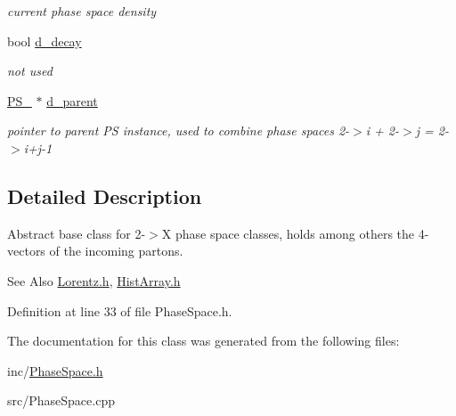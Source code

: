 \begin{DoxyCompactItemize}
\begin{DoxyCompactList}\small\item\em current phase space density \end{DoxyCompactList}\item 
\hypertarget{classPS__2_a973be656af67bb3516424e664a49ae55}{bool \hyperlink{classPS__2_a973be656af67bb3516424e664a49ae55}{d\-\_\-decay}}\label{classPS__2_a973be656af67bb3516424e664a49ae55}

\begin{DoxyCompactList}\small\item\em not used \end{DoxyCompactList}\item 
\hypertarget{classPS__2_abebb860c3c4a1c5054bc223d3aac4f45}{\hyperlink{classPS__2}{P\-S\-\_} $\ast$ \hyperlink{classPS__2_abebb860c3c4a1c5054bc223d3aac4f45}{d\-\_\-parent}}\label{classPS__2_abebb860c3c4a1c5054bc223d3aac4f45}

\begin{DoxyCompactList}\small\item\em pointer to parent P\-S instance, used to combine phase spaces 2-\/$>$i + 2-\/$>$j = 2-\/$>$i+j-\/1 \end{DoxyCompactList}\end{DoxyCompactItemize}


\subsection{Detailed Description}
Abstract base class for 2-\/$>$X phase space classes, holds among others the 4-\/vectors of the incoming partons. \begin{DoxySeeAlso}{See Also}
\hyperlink{Lorentz_8h}{Lorentz.\-h}, \hyperlink{HistArray_8h}{Hist\-Array.\-h} 
\end{DoxySeeAlso}


Definition at line 33 of file Phase\-Space.\-h.



The documentation for this class was generated from the following files\-:\begin{DoxyCompactItemize}
\item 
inc/\hyperlink{PhaseSpace_8h}{Phase\-Space.\-h}\item 
src/Phase\-Space.\-cpp\end{DoxyCompactItemize}
